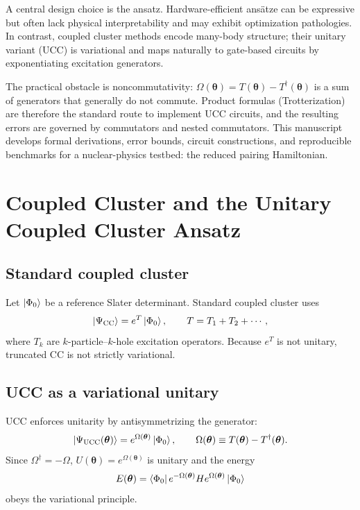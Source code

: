 \documentclass[11pt]{article}
\newcommand{\UCC}{\mathrm{UCC}}
\begin{document}
A central design choice is the ansatz. Hardware-efficient ans\"atze can be expressive but often lack
physical interpretability and may exhibit optimization pathologies.
In contrast, coupled cluster methods encode many-body structure; their unitary variant (UCC) is
variational and maps naturally to gate-based circuits by exponentiating excitation generators.

The practical obstacle is noncommutativity: $\Omega(\bm{\theta})=T(\bm{\theta})-T^\dagger(\bm{\theta})$
is a sum of generators that generally do not commute.
Product formulas (Trotterization) are therefore the standard route to implement UCC circuits, and the
resulting errors are governed by commutators and nested commutators.
This manuscript develops formal derivations, error bounds, circuit constructions, and reproducible
benchmarks for a nuclear-physics testbed: the reduced pairing Hamiltonian.

\section{Coupled Cluster and the Unitary Coupled Cluster Ansatz}

\subsection{Standard coupled cluster}
Let $\ket{\Phi_0}$ be a reference Slater determinant.
Standard coupled cluster uses
\begin{equation}
  \ket{\Psi_{\rm CC}} = e^{T}\ket{\Phi_0}, \qquad
  T = T_1 + T_2 + \cdots,
\end{equation}
where $T_k$ are $k$-particle--$k$-hole excitation operators.
Because $e^T$ is not unitary, truncated CC is not strictly variational.

\subsection{UCC as a variational unitary}
UCC enforces unitarity by antisymmetrizing the generator:
\begin{equation}
  \ket{\Psi_{\UCC}(\bm{\theta})} = e^{\Omega(\bm{\theta})}\ket{\Phi_0},
  \qquad
  \Omega(\bm{\theta}) \equiv T(\bm{\theta}) - T^\dagger(\bm{\theta}).
\end{equation}
Since $\Omega^\dagger=-\Omega$, $U(\bm{\theta})=e^{\Omega(\bm{\theta})}$ is unitary and the energy
\begin{equation}
  E(\bm{\theta})
  =\bra{\Phi_0}e^{-\Omega(\bm{\theta})}H e^{\Omega(\bm{\theta})}\ket{\Phi_0}
\end{equation}
obeys the variational principle.
\end{document}
